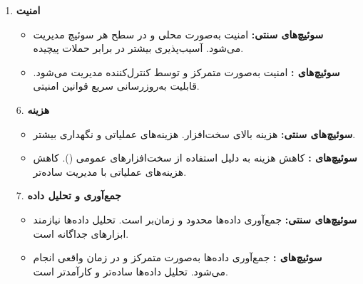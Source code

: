 \begin{qsolve}
\begin{enumerate}
		\item \textbf{امنیت}
		\begin{itemize}
			\item \textbf{سوئیچ‌های سنتی:} امنیت به‌صورت محلی و در سطح هر سوئیچ مدیریت می‌شود. آسیب‌پذیری بیشتر در برابر حملات پیچیده.
			\item \textbf{سوئیچ‌های :} امنیت به‌صورت متمرکز و توسط کنترل‌کننده مدیریت می‌شود. قابلیت به‌روزرسانی سریع قوانین امنیتی.
		\end{itemize}
	\end{enumerate}
\end{qsolve}
\newpage

\begin{qsolve}
	\begin{enumerate}
		\item [6.] \textbf{هزینه}
		\begin{itemize}
			\item \textbf{سوئیچ‌های سنتی:} هزینه بالای سخت‌افزار. هزینه‌های عملیاتی و نگهداری بیشتر.
			\item \textbf{سوئیچ‌های :} کاهش هزینه به دلیل استفاده از سخت‌افزارهای عمومی (). کاهش هزینه‌های عملیاتی با مدیریت ساده‌تر.
		\end{itemize}
		
		\item [7.] \textbf{جمع‌آوری و تحلیل داده}
		\begin{itemize}
			\item \textbf{سوئیچ‌های سنتی:} جمع‌آوری داده‌ها محدود و زمان‌بر است. تحلیل داده‌ها نیازمند ابزارهای جداگانه است.
			\item \textbf{سوئیچ‌های :} جمع‌آوری داده‌ها به‌صورت متمرکز و در زمان واقعی انجام می‌شود. تحلیل داده‌ها ساده‌تر و کارآمدتر است.
		\end{itemize}
	\end{enumerate}
\end{qsolve}